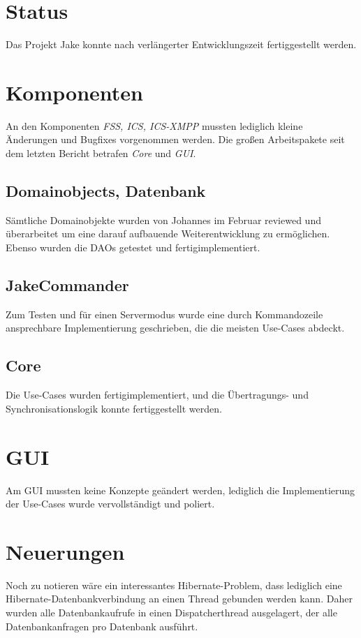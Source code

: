 \setcounter{chapter}{1}
\section{Status}
Das Projekt Jake konnte nach verlängerter Entwicklungszeit fertiggestellt werden.

\section{Komponenten}
An den Komponenten \emph{FSS, ICS, ICS-XMPP} mussten lediglich kleine Änderungen und Bugfixes vorgenommen werden. 
Die großen Arbeitspakete seit dem letzten Bericht betrafen \emph{Core} und \emph{GUI}.

\subsection{Domainobjects, Datenbank}
Sämtliche Domainobjekte wurden von Johannes im Februar reviewed und überarbeitet um eine darauf aufbauende Weiterentwicklung zu ermöglichen. Ebenso wurden die DAOs getestet und fertigimplementiert. 

\subsection{JakeCommander}
Zum Testen und für einen Servermodus wurde eine durch Kommandozeile ansprechbare Implementierung geschrieben, die die meisten Use-Cases abdeckt.


\subsection{Core}
Die Use-Cases wurden fertigimplementiert, und die Übertragungs- und Synchronisationslogik konnte fertiggestellt werden.


\section{GUI}
Am GUI mussten keine Konzepte geändert werden, lediglich die Implementierung der Use-Cases wurde vervollständigt und poliert.


\section{Neuerungen}
Noch zu notieren wäre ein interessantes Hibernate-Problem, dass lediglich eine Hibernate-Datenbankverbindung an einen Thread gebunden werden kann. Daher wurden alle Datenbankaufrufe in einen Dispatcherthread ausgelagert, der alle Datenbankanfragen pro Datenbank ausführt.


